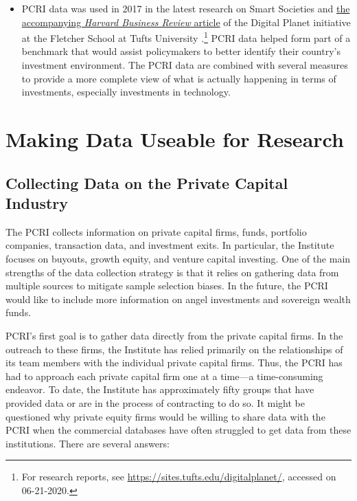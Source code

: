 \documentclass[
]{book}
\begin{document}
\begin{itemize}
\item
  PCRI data was used in 2017 in the latest research on Smart Societies and \href{https://sites.tufts.edu/digitalplanet/hbr-the-smart-society-of-the-future-doesnt-look-like-science-fiction/}{the accompanying \emph{Harvard Business Review} article} of the Digital Planet initiative at the Fletcher School at Tufts University \citep{chakrovorti2017}.\footnote{For research reports, see \url{https://sites.tufts.edu/digitalplanet/}, accessed on 06-21-2020.} PCRI data helped form part of a benchmark that would assist policymakers to better identify their country's investment environment. The PCRI data are combined with several measures to provide a more complete view of what is actually happening in terms of investments, especially investments in technology.
\end{itemize}

\hypertarget{making-data-useable-for-research}{%
\section{Making Data Useable for Research}\label{making-data-useable-for-research}}

\hypertarget{collecting-data-on-the-private-capital-industry}{%
\subsection{Collecting Data on the Private Capital Industry}\label{collecting-data-on-the-private-capital-industry}}

The PCRI collects information on private capital firms, funds, portfolio companies, transaction data, and investment exits. In particular, the Institute focuses on buyouts, growth equity, and venture capital investing. One of the main strengths of the data collection strategy is that it relies on gathering data from multiple sources to mitigate sample selection biases. In the future, the PCRI would like to include more information on angel investments and sovereign wealth funds.

PCRI's first goal is to gather data directly from the private capital firms. In the outreach to these firms, the Institute has relied primarily on the relationships of its team members with the individual private capital firms. Thus, the PCRI has had to approach each private capital firm one at a time---a time-consuming endeavor. To date, the Institute has approximately fifty groups that have provided data or are in the process of contracting to do so. It might be questioned why private equity firms would be willing to share data with the PCRI when the commercial databases have often struggled to get data from these institutions. There are several answers:
\end{document}
